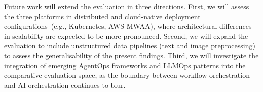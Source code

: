 \documentclass[journal]{IEEEtran}
\begin{document}
Future work will extend the evaluation in three directions. First, we
will assess the three platforms in distributed and cloud-native deployment
configurations~(e.g., Kubernetes, AWS MWAA), where architectural
differences in scalability are expected to be more pronounced. Second,
we will expand the evaluation to include unstructured data pipelines
(text and image preprocessing) to assess the generalisability of the
present findings. Third, we will investigate the integration of emerging
AgentOps frameworks and LLMOps patterns into the comparative evaluation
space, as the boundary between workflow orchestration and AI orchestration
continues to blur.



\end{document}
